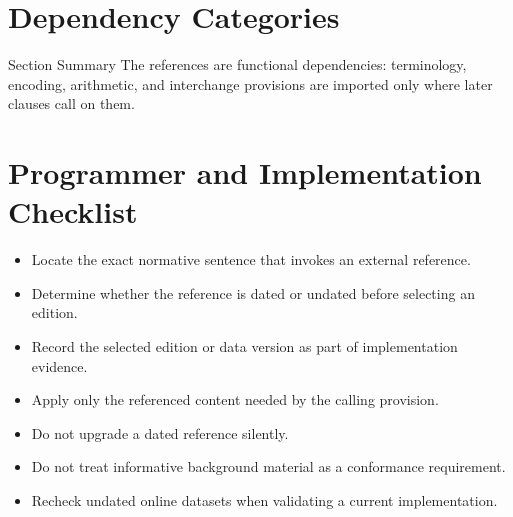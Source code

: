 \documentclass[10pt,letterpaper]{article}
\begin{document}
\section{Dependency Categories}
\begin{CornellNotesTable}
\end{CornellNotesTable}

\begin{CornellSummaryBox}{Section Summary}
The references are functional dependencies: terminology, encoding, arithmetic, and interchange provisions are imported only where later clauses call on them.
\end{CornellSummaryBox}



\section{Programmer and Implementation Checklist}
\begin{itemize}
  \item[$\square$] Locate the exact normative sentence that invokes an external reference.
  \item[$\square$] Determine whether the reference is dated or undated before selecting an edition.
  \item[$\square$] Record the selected edition or data version as part of implementation evidence.
  \item[$\square$] Apply only the referenced content needed by the calling provision.
  \item[$\square$] Do not upgrade a dated reference silently.
  \item[$\square$] Do not treat informative background material as a conformance requirement.
  \item[$\square$] Recheck undated online datasets when validating a current implementation.
\end{itemize}
\end{document}
